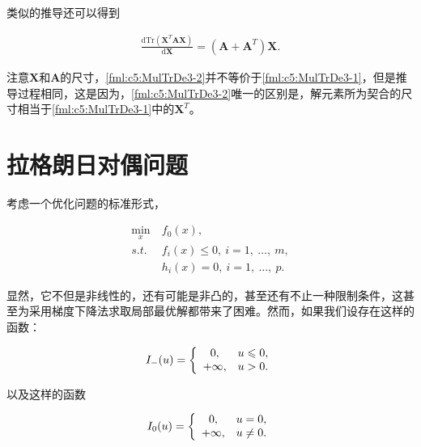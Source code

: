 \begin{example}
	类似的推导还可以得到
	
	\begin{equation}\label{fml:c5:MulTrDe3-2}
		\begin{aligned}
			\frac{\mathrm{d} \mathrm{Tr}(\mathbf{X}^T \mathbf{A} \mathbf{X}) }{\mathrm{d}\mathbf{X}} = (\mathbf{A}+\mathbf{A}^T)\mathbf{X}.
		\end{aligned}
	\end{equation}
	
	注意$\mathbf{X}$和$\mathbf{A}$的尺寸，\eqref{fml:c5:MulTrDe3-2}并不等价于\ref{fml:c5:MulTrDe3-1}，但是推导过程相同，这是因为，\eqref{fml:c5:MulTrDe3-2}唯一的区别是，解元素所为契合的尺寸相当于\eqref{fml:c5:MulTrDe3-1}中的$\mathbf{X}^T$。
	
\end{example}

\section{拉格朗日对偶问题}
考虑一个优化问题的标准形式，
\begin{problem}[普通优化问题] \label{def:c5:commonOpt}
	\begin{subequations}
		\renewcommand{\theequation}
		{\theparentequation-\arabic{equation}}
		\begin{align}
		\min\limits_{x}~&f_0(x),\label{fml:c5:commonOpt}\\ 
		s.t.~&f_i(x) \leqslant 0,~i=1,~\ldots,~m, \label{fml:c5:commonOptConst1}\\
		&h_i(x) = 0,~i=1,~\ldots,~p. \label{fml:c5:commonOptConst2}
		\end{align}
	\end{subequations}
\end{problem}

显然，它不但是非线性的，还有可能是非凸的，甚至还有不止一种限制条件，这甚至为采用梯度下降法求取局部最优解都带来了困难。然而，如果我们设存在这样的函数：

\begin{equation}\label{fml:c5:neg2inf}
	I_-(u) = \left\{
	\begin{array}{c    l}
		0, &u \leqslant 0,\\
		+\infty, &u > 0.
	\end{array}
	\right.
\end{equation}

以及这样的函数

\begin{equation}\label{fml:c5:nonzero2inf}
	I_0(u) = \left\{
	\begin{array}{c    l}
		0, &u = 0,\\
		+\infty, &u \neq 0.
	\end{array}
	\right.
\end{equation}

